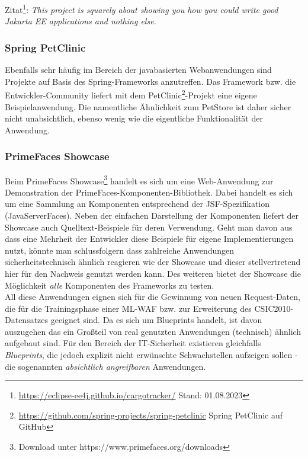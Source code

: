 \textcolor{bhtGray}{ Zitat\footnote{\url{https://eclipse-ee4j.github.io/cargotracker/} Stand: 01.08.2023}:} \emph{This project is squarely about showing you how you could write good Jakarta EE applications and nothing else.}


\subsubsection{Spring PetClinic}
Ebenfalls sehr häufig im Bereich der javabasierten Webanwendungen sind Projekte auf Basis des Spring-Frameworks anzutreffen. Das Framework bzw. die Entwickler-Community liefert mit dem PetClinic\footnote{\url{https://github.com/spring-projects/spring-petclinic} Spring PetClinic auf GitHub}-Projekt eine eigene Beispielanwendung. Die namentliche Ähnlichkeit zum PetStore ist daher sicher nicht unabsichtlich, ebenso wenig wie die eigentliche Funktionalität der Anwendung. 


\subsubsection{PrimeFaces Showcase}

Beim PrimeFaces Showcase\footnote{Download unter https://www.primefaces.org/downloads} handelt es sich um eine Web-Anwendung zur Demonstration der PrimeFaces-Komponenten-Bibliothek. Dabei handelt es sich um eine Sammlung an Komponenten entsprechend der JSF-Spezifikation (JavaServerFaces). Neben der einfachen Darstellung der Komponenten liefert der Showcase auch Quelltext-Beispiele für deren Verwendung. Geht man davon aus dass eine Mehrheit der Entwickler diese Beispiele für eigene Implementierungen nutzt, könnte man schlussfolgern dass zahlreiche Anwendungen sicherheitstechnisch ähnlich reagieren wie der Showcase und dieser stellvertretend hier für den Nachweis genutzt werden kann. Des weiteren bietet der Showcase die Möglichkeit \emph{alle} Komponenten des Frameworks zu testen.\\

All diese Anwendungen eignen sich für die Gewinnung von neuen Request-Daten, die für die Trainingsphase einer ML-WAF bzw. zur Erweiterung des CSIC2010-Datensatzes geeignet sind. Da es sich um Blueprints handelt, ist davon auszugehen das ein Großteil von real genutzten Anwendungen (technisch) ähnlich aufgebaut sind. Für den Bereich der IT-Sicherheit existieren gleichfalls \emph{Blueprints}, die jedoch explizit nicht erwünschte Schwachstellen aufzeigen sollen - die sogenannten \emph{absichtlich angreifbaren} Anwendungen. 

